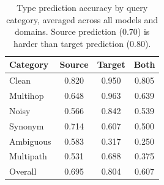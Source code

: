\begin{table}[t]
\centering
\small
\begin{tabular}{l ccc}
\toprule
\textbf{Category} & \textbf{Source} & \textbf{Target} & \textbf{Both} \\
\midrule
Clean & 0.820 & 0.950 & 0.805 \\
Multihop & 0.648 & 0.963 & 0.639 \\
Noisy & 0.566 & 0.842 & 0.539 \\
Synonym & 0.714 & 0.607 & 0.500 \\
Ambiguous & 0.583 & 0.317 & 0.250 \\
Multipath & 0.531 & 0.688 & 0.375 \\
\midrule
Overall & 0.695 & 0.804 & 0.607 \\
\bottomrule
\end{tabular}
\caption{Type prediction accuracy by query category, averaged across all models and domains. Source prediction (0.70) is harder than target prediction (0.80).}
\label{tab:type-prediction}
\end{table}